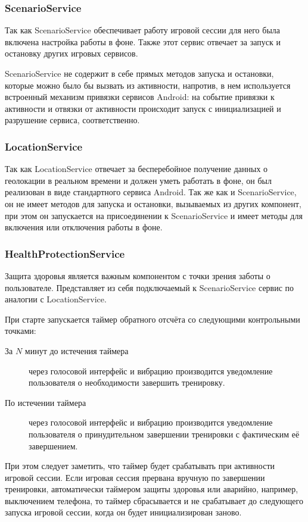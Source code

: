 \subsubsection*{ScenarioService}
Так как ScenarioService обеспечивает работу игровой сессии для него была включена настройка работы в фоне. Также этот сервис отвечает за запуск и остановку других игровых сервисов. 

ScenarioService не содержит в себе прямых методов запуска и остановки, которые можно было бы вызвать из активности, напротив, в нем используется встроенный механизм привязки сервисов Android: на событие привязки к активности и отвязки от активности происходит запуск с инициализацией и разрушение сервиса, соответственно.
\subsubsection*{LocationService}
Так как LocationService отвечает за бесперебойное получение данных о геолокации в реальном времени и должен уметь работать в фоне, он был реализован в виде стандартного сервиса Android. Так же как и ScenarioService, он не имеет методов для запуска и остановки, вызываемых из других компонент, при этом он запускается на присоединении к ScenarioService и имеет методы для включения или отключения работы в фоне.

\subsubsection*{HealthProtectionService}
Защита здоровья является важным компонентом с точки зрения заботы о пользователе. Представляет из себя подключаемый к ScenarioService сервис по аналогии с LocationService. 

При старте запускается таймер обратного отсчёта со следующими контрольными точками:
\begin{description}
	\item[За $N$ минут до истечения таймера] через голосовой интерфейс и вибрацию производится уведомление пользователя о необходимости завершить тренировку.
	\item[По истечении таймера] через голосовой интерфейс и вибрацию производится уведомление пользователя о принудительном завершении тренировки с фактическим её завершением.
\end{description}
\smallskip
При этом следует заметить, что таймер будет срабатывать при активности игровой сессии. 
Если игровая сессия прервана вручную по завершении тренировки, автоматически таймером защиты здоровья или аварийно, например, выключением телефона, то таймер сбрасывается и не срабатывает до следующего запуска игровой сессии, когда он будет инициализирован заново.

